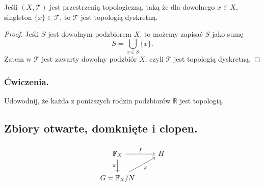 \begin{theorem}
    Jeśli $\left( X, \mathcal{T} \right)  $ jest przestrzenią topologiczną, taką że dla dowolnego $x \in X$, singleton $\{x\} \in \mathcal{T} $, to $\mathcal{T}$ jest topologią dyskretną. 
\end{theorem} 
\begin{proof}
    Jeśli $S$ jest dowolnym podzbiorem $X$, to możemy zapisać $S$ jako sumę
   \[
       S = \bigcup_{x \in S} \{x\}    
   .\]
    Zatem w $\mathcal{T}$ jest zawarty dowolny podzbiór $X$, czyli $\mathcal{T}$ jest topologią dyskretną. 
\end{proof} 
\subsubsection*{Ćwiczenia.}
\begin{problem}[5]
    Udowodnij, że każda z poniższych rodzin podzbiorów $\mathbb{R}$ jest topologią.
\end{problem} 
\subsection{Zbiory otwarte, domknięte i clopen.}

\[
    \begin{tikzcd} \mathbb{F}_X \arrow[r, "\overline{f}"] \arrow[d, "\pi"'] & H \\ G = \mathbb{F}_X/N \arrow[ru, "\varphi"'] \end{tikzcd}
\]
